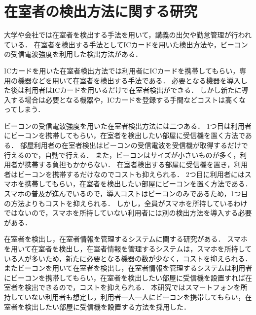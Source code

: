 \section{在室者の検出方法に関する研究}\label{2.2}
大学や会社では在室者を検出する手法を用いて，講義の出欠\cite{smartphone}\cite{nfcandroid}\cite{university1}\cite{university2}\cite{garake}や勤怠管理\cite{amano}が行われている．
在室者を検出する手法としてICカードを用いた検出方法\cite{zyugyou}\cite{felica}\cite{densi}\cite{felica2}\cite{notouchic}\cite{felicaweb}\cite{suica}や，ビーコンの受信電波強度を利用した検出方法\cite{bledakoku}\cite{blesuitei}がある．

ICカードを用いた在室者検出方法では利用者にICカードを携帯してもらい，専用の機器などを用いて在室者を検出する手法である．
必要となる機器を導入した後は利用者はICカードを用いるだけで在室者検出ができる．
しかし新たに導入する場合は必要となる機器や，ICカードを登録する手間などコストは高くなってしまう．

ビーコンの受信電波強度を用いた在室者検出方法には二つある．
1つ目は利用者にビーコンを携帯してもらい，在室者を検出したい部屋に受信機を置く方法である．
部屋利用者の在室者検出はビーコンの受信電波を受信機が取得するだけで行えるので，自動で行える．
また，ビーコンはサイズが小さいものが多く，利用者が携帯する負担もかからない．
在室者検出する部屋に受信機を置き，利用者はビーコンを携帯するだけなのでコストも抑えられる．
2つ目に利用者にはスマホを携帯してもらい，在室者を検出したい部屋にビーコンを置く方法である．
スマホの普及が進んでいる\cite{hukyu}ので，導入コストはビーコンのみであるため，1つ目の方法よりもコストを抑えられる．
しかし，全員がスマホを所持しているわけではないので，スマホを所持していない利用者には別の検出方法を導入する必要がある．

在室者を検出し，在室者情報を管理するシステムに関する研究がある\cite{smartphoneAndRoom}\cite{laboratory}\cite{prep}．
スマホを用いて在室者を検出し，在室者情報を管理するシステムは，スマホを所持している人が多いため，新たに必要となる機器の数が少なく，コストを抑えられる\cite{smartphoneAndRoom}．
またビーコンを用いて在室者を検出し，在室者情報を管理するシステムは利用者にビーコンを携帯してもらい，在室者を検出したい部屋に受信機を設置すれば在室者を検出できるので，コストを抑えられる\cite{laboratory}\cite{prep}．
本研究ではスマートフォンを所持していない利用者も想定し，利用者一人一人にビーコンを携帯してもらい，在室者を検出したい部屋に受信機を設置する方法を採用した．
